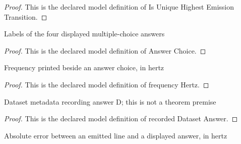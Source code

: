 \begin{proof}
  This is the declared model definition of Is Unique Highest Emission Transition.
\end{proof}
\begin{definition}
  \label{def:physics:phyx-mini-0517:phyxminiproblems-problemphyxmini0517-answerchoice}
  Labels of the four displayed multiple-choice answers
\end{definition}
\begin{proof}
  This is the declared model definition of Answer Choice.
\end{proof}
\begin{definition}
  \label{def:physics:phyx-mini-0517:phyxminiproblems-problemphyxmini0517-answerchoice-frequencyhertz}
  Frequency printed beside an answer choice, in hertz
\end{definition}
\begin{proof}
  This is the declared model definition of frequency Hertz.
\end{proof}
\begin{definition}
  \label{def:physics:phyx-mini-0517:phyxminiproblems-problemphyxmini0517-recordeddatasetanswer}
  Dataset metadata recording answer D; this is not a theorem premise
\end{definition}
\begin{proof}
  This is the declared model definition of recorded Dataset Answer.
\end{proof}
\begin{definition}
  \label{def:physics:phyx-mini-0517:phyxminiproblems-problemphyxmini0517-answerchoiceerrorhertz}
  Absolute error between an emitted line and a displayed answer, in hertz
\end{definition}
